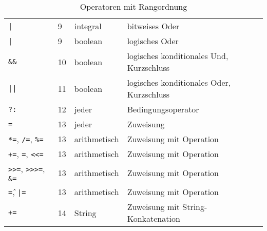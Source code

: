 \begin{table}[H]
\begin{tabular}{llll}
\texttt{|}&9&integral&bitweises Oder\\
\texttt{|}&9&boolean&logisches Oder\\\hline
\texttt{\&\&}&10&boolean&logisches konditionales Und, Kurzschluss\\\hline
\texttt{||}&11&boolean&logisches konditionales Oder, Kurzschluss\\
\texttt{?:}&12&jeder&Bedingungsoperator\\
\texttt{=}&13&jeder&Zuweisung\\
\texttt{*=}, \texttt{/=}, \texttt{\%=}&13&arithmetisch&Zuweisung mit Operation\\
\texttt{+=}, \texttt{=}, \texttt{<<=}&13&arithmetisch&Zuweisung mit Operation\\
\texttt{>>=}, \texttt{>>>=}, \texttt{\&=}&13&arithmetisch&Zuweisung mit Operation\\
\texttt{\^=}, \texttt{|=}&13&arithmetisch&Zuweisung mit Operation\\
\texttt{+=}&14&String&Zuweisung mit String-Konkatenation\\\hline
\end{tabular}
\caption{Operatoren mit Rangordnung}
\end{table}
